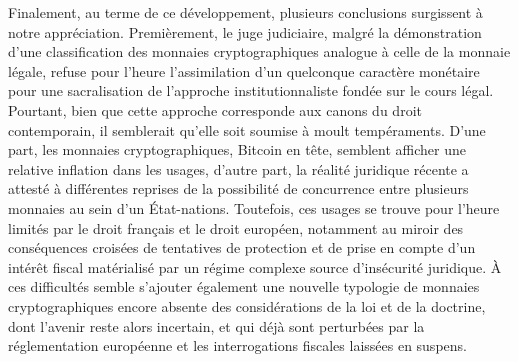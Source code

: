 {Finalement, au terme de ce développement, plusieurs conclusions surgissent à notre appréciation. Premièrement, le juge judiciaire, malgré la démonstration d'une classification des monnaies cryptographiques analogue à celle de la monnaie légale, refuse pour l'heure l'assimilation d'un quelconque caractère monétaire pour une sacralisation de l'approche institutionnaliste fondée sur le cours légal. Pourtant, bien que cette approche corresponde aux canons du droit contemporain, il semblerait qu'elle soit soumise à moult tempéraments. D'une part, les monnaies cryptographiques, Bitcoin en tête, semblent afficher une relative inflation dans les usages, d'autre part, la réalité juridique récente a attesté à différentes reprises de la possibilité de concurrence entre plusieurs monnaies au sein d'un État-nations. Toutefois, ces usages se trouve pour l'heure limités par le droit français et le droit européen, notamment au miroir des conséquences croisées de tentatives de protection et de prise en compte d'un intérêt fiscal matérialisé par un régime complexe source d'insécurité juridique. À ces difficultés semble s'ajouter également une nouvelle typologie de monnaies cryptographiques encore absente des considérations de la loi et de la doctrine, dont l'avenir reste alors incertain, et qui déjà sont perturbées par la réglementation européenne et les interrogations fiscales laissées en suspens. 

\newpage
}
